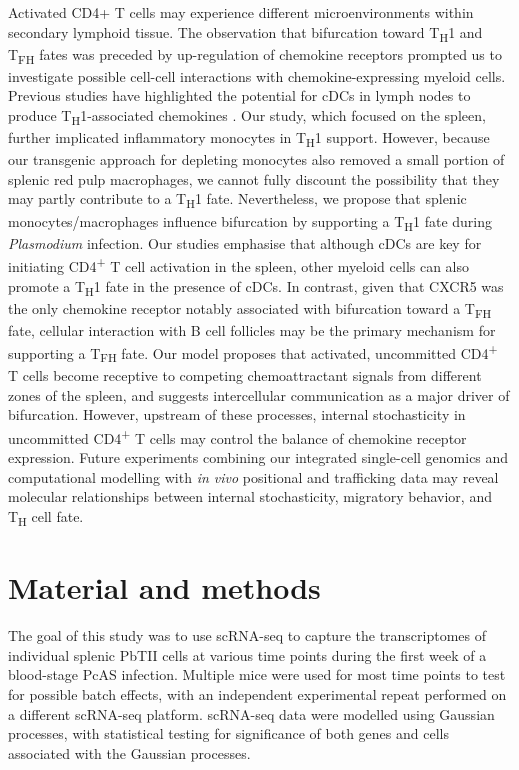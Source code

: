 Activated CD4+ T cells may experience different microenvironments within secondary lymphoid tissue. The observation that bifurcation toward T\textsubscript{H}1 and T\textsubscript{FH} fates was preceded by up-regulation of chemokine receptors prompted us to investigate possible cell-cell interactions with chemokine-expressing myeloid cells. Previous studies have highlighted the potential for cDCs in lymph nodes to produce T\textsubscript{H}1-associated chemokines \cite{Groom2012-az}. Our study, which focused on the spleen, further implicated inflammatory monocytes in T\textsubscript{H}1 support. However, because our transgenic approach for depleting monocytes also removed a small portion of splenic red pulp macrophages, we cannot fully discount the possibility that they may partly contribute to a T\textsubscript{H}1 fate. Nevertheless, we propose that splenic monocytes/macrophages influence bifurcation by supporting a T\textsubscript{H}1 fate during \textit{Plasmodium} infection. Our studies emphasise that although cDCs are key for initiating CD4\textsuperscript{+} T cell activation in the spleen, other myeloid cells can also promote a T\textsubscript{H}1 fate in the presence of cDCs. In contrast, given that CXCR5 was the only chemokine receptor notably associated with bifurcation toward a T\textsubscript{FH} fate, cellular interaction with B cell follicles may be the primary mechanism for supporting a T\textsubscript{FH} fate. Our model proposes that activated, uncommitted CD4\textsuperscript{+} T cells become receptive to competing chemoattractant signals from different zones of the spleen, and suggests intercellular communication as a major driver of bifurcation. However, upstream of these processes, internal stochasticity in uncommitted CD4\textsuperscript{+} T cells may control the balance of chemokine receptor expression. Future experiments combining our integrated single-cell genomics and computational modelling with \textit{in vivo} positional and trafficking data may reveal molecular relationships between internal stochasticity, migratory behavior, and T\textsubscript{H} cell fate.

\section{Material and methods}

The goal of this study was to use scRNA-seq to capture the transcriptomes of individual splenic PbTII cells at various time points during the first week of a blood-stage PcAS infection. Multiple mice were used for most time points to test for possible batch effects, with an independent experimental repeat performed on a different scRNA-seq platform. scRNA-seq data were modelled using Gaussian processes, with statistical testing for significance of both genes and cells associated with the Gaussian processes.

